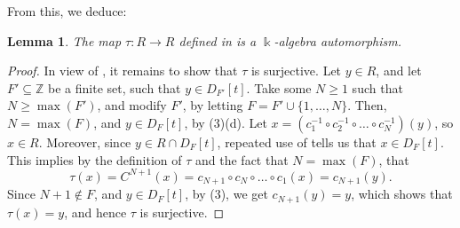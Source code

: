 \documentclass{amsart}
\newtheorem{lem}[equation]{Lemma}
\theoremstyle{definition}
\renewcommand{\k}{\Bbbk}
\numberwithin{equation}{section}
\begin{document}
From this, we deduce:
\begin{lem}\label{lem:tauAuto}
The map $\tau:R \to R$ defined in  is a $\k$-algebra automorphism.    
\end{lem}
\begin{proof}
In view of , it remains to show that $\tau$ is surjective.
Let $y \in R$, and let $F' \subseteq \mathbb{Z}$ be a finite set, such that $y \in D_{F'}[t]$.
Take some $N \ge 1$ such that $N \ge \max(F')$,
and modify $F'$, by letting $F = F' \cup \{1,\dots, N\}$.
Then, $N = \max(F)$, and $y \in D_F[t]$, by (3)(d).
Let $x = (c_1^{-1} \circ c_2^{-1} \circ \dots \circ c_N^{-1})(y)$, so $x \in R$.
Moreover, since $y \in R\cap D_F[t]$,
repeated use of  tells us that $x \in D_F[t]$.
This implies by the definition of $\tau$ and the fact that $N = \max(F)$,
that
\[
\tau(x) = C^{N+1}(x) = c_{N+1}\circ c_N \circ \dots \circ c_1(x) = c_{N+1}(y).
\]
Since $N+1 \notin F$, and $y \in D_F[t]$,
by (3), we get $c_{N+1}(y) =y$,
which shows that $\tau(x) = y$, and hence $\tau$ is surjective.
\end{proof} 
\end{document}
